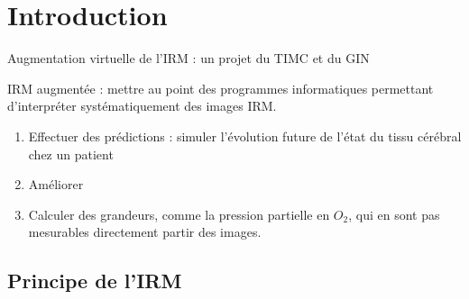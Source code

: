 \section{Introduction}

\begin{comment}
Mon stage s'est d\'eroul\'e au laboratoire TIMC-IMAG (Techniques de l'Ingénierie M\'edicale et de la Complexit\'e - %
Informatique, Mathématiques et Applications, Grenoble), sous la direction d'Angélique Stéphanou (CNRS). %
Il s'inscrit dans le projet Imagerie par Résonnance Magn\'etique Augment\'ee (IRMA) qui vise \g{a} effectuer des pr\'edictions, %
\g{a} partir d'images IRM, sur des param\g{e}tres qui ne sont pas directement mesurables comme la pression art\'erielle en dioxyg\g{e}ne $P_aO_2$ %
ou avec une meilleure r\'esolution spatiotemporelle que celle des images brutes. %
Un autre aspect de l'augmentation virtuelle de l'imagerie par résonnance magnétique est la simulation, \g{a} partir d'une image initiale, %
de l'évolution de l'état d'un patient sur des \'echelles de temps plus ou moins longues. %
C'est l'objet de ce travail, qui doit permettre de retracer l'\'evolution, sur plusieurs semaines, de l'\'etat d'un cerveau de rat isch\'emi\'e.
\end{comment}

Augmentation virtuelle de l'IRM : un projet du TIMC et du GIN

IRM augment\'ee : mettre au point des programmes informatiques permettant d'interpr\'eter syst\'ematiquement des images IRM.
\begin{enumerate}
\item Effectuer des pr\'edictions : simuler l'\'evolution future de l'\'etat du tissu c\'er\'ebral chez un patient%

\item Am\'eliorer 
\item Calculer des grandeurs, comme la pression partielle en $O_2$, qui en sont pas mesurables directement  partir des images.
\end{enumerate}






\subsection{Principe de l'IRM}%


